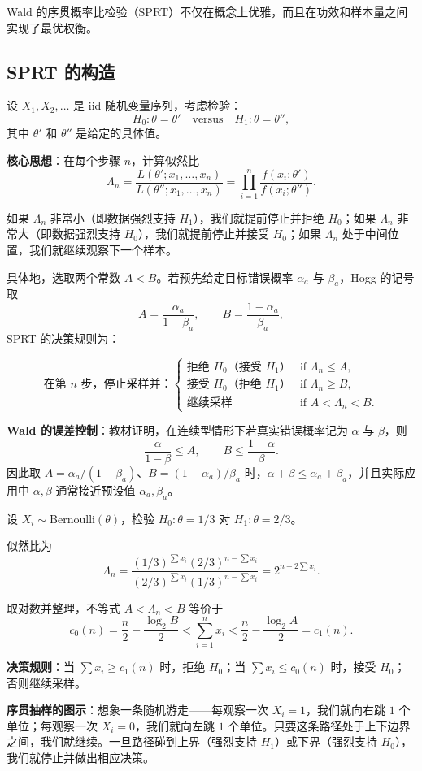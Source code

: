 Wald 的序贯概率比检验（SPRT）不仅在概念上优雅，而且在功效和样本量之间实现了最优权衡。

\subsection{SPRT 的构造}

设 $X_1, X_2, \ldots$ 是 iid 随机变量序列，考虑检验：
\[
H_0: \theta = \theta' \quad \text{versus} \quad H_1: \theta = \theta'',
\]
其中 $\theta'$ 和 $\theta''$ 是给定的具体值。

\textbf{核心思想}：在每个步骤 $n$，计算似然比
\[
\Lambda_n = \frac{L(\theta'; x_1, \ldots, x_n)}{L(\theta''; x_1, \ldots, x_n)} = \prod_{i=1}^n \frac{f(x_i; \theta')}{f(x_i; \theta'')}.
\]

如果 $\Lambda_n$ 非常小（即数据强烈支持 $H_1$），我们就提前停止并拒绝 $H_0$；如果 $\Lambda_n$ 非常大（即数据强烈支持 $H_0$），我们就提前停止并接受 $H_0$；如果 $\Lambda_n$ 处于中间位置，我们就继续观察下一个样本。

具体地，选取两个常数 $A < B$。若预先给定目标错误概率 $\alpha_a$ 与 $\beta_a$，Hogg 的记号取
\[
A = \frac{\alpha_a}{1-\beta_a}, \qquad B = \frac{1-\alpha_a}{\beta_a},
\]
SPRT 的决策规则为：

\[
\text{在第 $n$ 步，停止采样并：}
\begin{cases}
\text{拒绝 $H_0$（接受 $H_1$）} & \text{if } \Lambda_n \leq A, \\
\text{接受 $H_0$（拒绝 $H_1$）} & \text{if } \Lambda_n \geq B, \\
\text{继续采样} & \text{if } A < \Lambda_n < B.
\end{cases}
\label{eq:sprt-rule}
\]

\textbf{Wald 的误差控制}：教材证明，在连续型情形下若真实错误概率记为 $\alpha$ 与 $\beta$，则
\[
\frac{\alpha}{1-\beta} \leq A, \qquad B \leq \frac{1-\alpha}{\beta}.
\]
因此取 $A=\alpha_a/(1-\beta_a)$、$B=(1-\alpha_a)/\beta_a$ 时，$\alpha+\beta \leq \alpha_a+\beta_a$，并且实际应用中 $\alpha,\beta$ 通常接近预设值 $\alpha_a,\beta_a$。

\begin{example}\label{ex:bernoulli-sprt}
设 $X_i \sim \mathrm{Bernoulli}(\theta)$，检验 $H_0: \theta = 1/3$ 对 $H_1: \theta = 2/3$。

似然比为
\[
\Lambda_n = \frac{(1/3)^{\sum x_i} (2/3)^{n-\sum x_i}}{(2/3)^{\sum x_i} (1/3)^{n-\sum x_i}} = 2^{n - 2\sum x_i}.
\]

取对数并整理，不等式 $A < \Lambda_n < B$ 等价于
\[
c_0(n) = \frac{n}{2} - \frac{\log_2 B}{2} < \sum_{i=1}^n x_i < \frac{n}{2} - \frac{\log_2 A}{2} = c_1(n).
\]

\textbf{决策规则}：当 $\sum x_i \geq c_1(n)$ 时，拒绝 $H_0$；当 $\sum x_i \leq c_0(n)$ 时，接受 $H_0$；否则继续采样。

\textbf{序贯抽样的图示}：想象一条随机游走——每观察一次 $X_i = 1$，我们就向右跳 $1$ 个单位；每观察一次 $X_i = 0$，我们就向左跳 $1$ 个单位。只要这条路径处于上下边界之间，我们就继续。一旦路径碰到上界（强烈支持 $H_1$）或下界（强烈支持 $H_0$），我们就停止并做出相应决策。\end{example}

